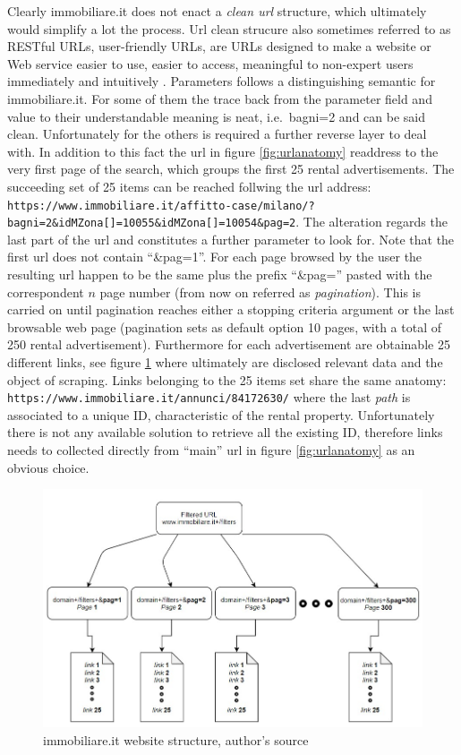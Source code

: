 \documentclass[
  12pt,
  a4paper,
  oneside]{book}
\theoremstyle{definition}
\theoremstyle{definition}
\theoremstyle{definition}
\theoremstyle{remark}
\begin{document}
Clearly immobiliare.it does not enact a \emph{clean url} structure, which ultimately would simplify a lot the process. Url clean strucure also sometimes referred to as RESTful URLs, user-friendly URLs, are URLs designed to make a website or Web service easier to use, easier to access, meaningful to non-expert users immediately and intuitively \citep{wiki:cleanurl}.
Parameters follows a distinguishing semantic for immobiliare.it. For some of them the trace back from the parameter field and value to their understandable meaning is neat, i.e.~bagni=2 and can be said clean. Unfortunately for the others is required a further reverse layer to deal with.
In addition to this fact the url in figure \ref{fig:urlanatomy} readdress to the very first page of the search, which groups the first 25 rental advertisements. The succeeding set of 25 items can be reached follwing the url address:
\texttt{https://www.immobiliare.it/affitto-case/milano/?bagni=2\&idMZona{[}{]}=10055\&idMZona{[}{]}=10054\&pag=2}. The alteration regards the last part of the url and constitutes a further parameter to look for. Note that the first url does not contain ``\&pag=1''. For each page browsed by the user the resulting url happen to be the same plus the prefix ``\&pag='' pasted with the correspondent \(n\) page number (from now on referred as \emph{pagination}). This is carried on until pagination reaches either a stopping criteria argument or the last browsable web page (pagination sets as default option 10 pages, with a total of 250 rental advertisement).
Furthermore for each advertisement are obtainable 25 different links, see figure \ref{fig:nestedstructure} where ultimately are disclosed relevant data and the object of scraping. Links belonging to the 25 items set share the same anatomy: \texttt{https://www.immobiliare.it/annunci/84172630/} where the last \emph{path} is associated to a unique
ID, characteristic of the rental property. Unfortunately there is not any available solution to retrieve all the existing ID, therefore links needs to collected directly from ``main'' url in figure \ref{fig:urlanatomy} as an obvious choice.

\begin{figure}
\centering
\includegraphics{images/website_tree1.jpg}
\caption{\label{fig:nestedstructure}immobiliare.it website structure, author's source}
\end{figure}
\end{document}
